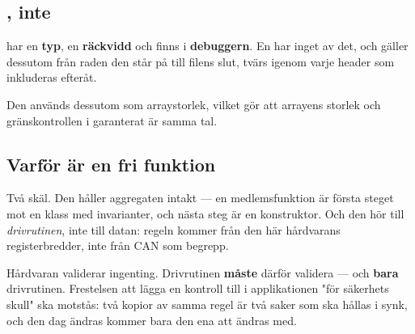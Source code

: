 \subsection{\texorpdfstring{}{static constexpr}, inte \texorpdfstring{}{define}}

 har en \textbf{typ}, en \textbf{räckvidd} och finns i \textbf{debuggern}. En
 har inget av det, och gäller dessutom från raden den står på till filens slut, tvärs
igenom varje header som inkluderas efteråt.

Den används dessutom som arraystorlek, vilket gör att arrayens storlek och gränskontrollen i
 garanterat är samma tal.

\subsection{Varför \texorpdfstring{}{isValid()} är en fri funktion}

Två skäl. Den håller aggregaten intakt --- en medlemsfunktion är första steget mot en klass med
invarianter, och nästa steg är en konstruktor. Och den hör till \emph{drivrutinen}, inte till
datan: regeln kommer från den här hårdvarans registerbredder, inte från CAN som begrepp.

\begin{aside}
\note[Regel] Hårdvaran validerar ingenting. Drivrutinen \textbf{måste} därför validera --- och
\textbf{bara} drivrutinen. Frestelsen att lägga en kontroll till i applikationen "för säkerhets
skull" ska motstås: två kopior av samma regel är två saker som ska hållas i synk, och den dag
 ändras kommer bara den ena att ändras med.
\end{aside}
